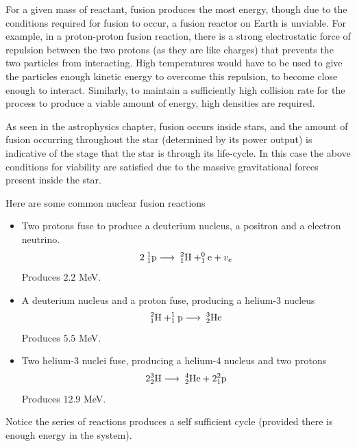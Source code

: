 For a given mass of reactant, fusion produces the most energy, though due to the conditions required for fusion to occur, a fusion reactor on Earth is unviable. For example, in a proton-proton fusion reaction, there is a strong electrostatic force of repulsion between the two protons (as they are like charges) that prevents the two particles from interacting. High temperatures would have to be used to give the particles enough kinetic energy to overcome this repulsion, to become close enough to interact. Similarly, to maintain a sufficiently high collision rate for the process to produce a viable amount of energy, high densities are required. 

As seen in the astrophysics chapter, fusion occurs inside stars, and the amount of fusion occurring throughout the star (determined by its power output) is indicative of the stage that the star is through its life-cycle. In this case the above conditions for viability are satisfied due to the massive gravitational forces present inside the star. 

Here are some common nuclear fusion reactions
\begin{itemize}
    \item Two protons fuse to produce a deuterium nucleus, a positron and a electron neutrino. 
    \begin{equation}
        2 \hspace{1mm} _1^1 \text{p} \longrightarrow \hspace{1mm} _1^2\text{H} + _1^0 \text{e} + v_e
    \end{equation}
    Produces $2.2$ MeV.
    \item A deuterium nucleus and a proton fuse, producing a helium-3 nucleus
    \begin{equation}
        _1^2\text{H} + _1^1\text{p} \longrightarrow \hspace{1mm} _2^3\text{He}
    \end{equation}
    Produces $5.5$ MeV.
    \item Two helium-3 nuclei fuse, producing a helium-4 nucleus and two protons
    \begin{equation}
        2 _2^3\text{H} \longrightarrow \hspace{1mm} _2^4\text{He} + 2_1^2\text{p}
    \end{equation}
    Produces $12.9$ MeV.
\end{itemize}

Notice the series of reactions produces a self sufficient cycle (provided there is enough energy in the system). 

